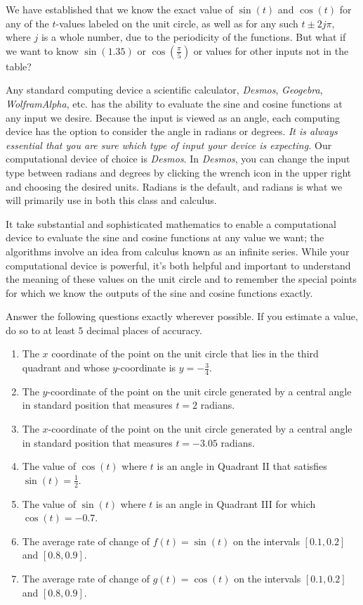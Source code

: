 \documentclass[nooutcomes]{ximera}
\begin{document}
We have established that we know the exact value of \(\sin(t)\) and \(\cos(t)\) for any of the \(t\)-values labeled on the unit circle, as well as for any such \(t \pm 2j\pi\), where \(j\) is a whole number, due to the periodicity of the functions.  But what if we want to know \(\sin(1.35)\) or \(\cos\left(\frac{\pi}{5}\right)\) or values for other inputs not in the table?%

Any standard computing device a scientific calculator, \emph{Desmos}, \emph{Geogebra}, \emph{WolframAlpha}, etc. has the ability to evaluate the sine and cosine functions at any input we desire.  Because the input is viewed as an angle, each computing device has the option to consider the angle in radians or degrees.  \emph{It is always essential that you are sure which type of input your device is expecting.}  Our computational device of choice is \emph{Desmos}.  In \emph{Desmos}, you can change the input type between radians and degrees by clicking the wrench icon in the upper right and choosing the desired units.  Radians is the default, and radians is what we will primarily use in both this class and calculus.%

It take substantial and sophisticated mathematics to enable a computational device to evaluate the sine and cosine functions at any value we want; the algorithms involve an idea from calculus known as an infinite series.  While your computational device is powerful, it's both helpful and important to understand the meaning of these values on the unit circle and to remember the special points for which we know the outputs of the sine and cosine functions exactly.%
\begin{exploration}

Answer the following questions exactly wherever possible.  If you estimate a value, do so to at least \(5\) decimal places of accuracy.%

\begin{enumerate}[label=\alph*.]
\item
The \(x\) coordinate of the point on the unit circle that lies in the third quadrant and whose \(y\)-coordinate is \(y = -\frac{3}{4}\).%
\item
The \(y\)-coordinate of the point on the unit circle generated by a central angle in standard position that measures \(t = 2\) radians.%
\item
The \(x\)-coordinate of the point on the unit circle generated by a central angle in standard position that measures \(t = -3.05\) radians.%
\item
The value of \(\cos(t)\) where \(t\) is an angle in Quadrant II that satisfies \(\sin(t) = \frac{1}{2}\).%
\item
The value of \(\sin(t)\) where \(t\) is an angle in Quadrant III for which \(\cos(t) = -0.7\).%
\item
The average rate of change of \(f(t) = \sin(t)\) on the intervals \([0.1,0.2]\) and \([0.8,0.9]\).%
\item
The average rate of change of \(g(t) = \cos(t)\) on the intervals \([0.1,0.2]\) and \([0.8,0.9]\).%
\end{enumerate}
%
\end{exploration}
\end{document}
